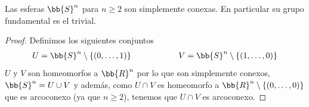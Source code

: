 \begin{coro}
    Las esferas $\bb{S}^n$ para $n\geq 2$ son simplemente conexas. En particular su grupo fundamental es el trivial.

    \begin{proof}
        Definimos los siguientes conjuntos
        \begin{gather*}
            U=\bb{S}^n \setminus \{(0,\dots,1)\} \hspace{2cm} 
            V = \bb{S}^n \setminus \{(1,\dots,0)\}
        \end{gather*}
        $U$ y $V$ son homeomorfos a $\bb{R}^n$ por lo que son simplemente conexos, $\bb{S}^n=U\cup V$ y además, como $U\cap V$ es homeomorfo a $\bb{R}^n \setminus \{(0,\dots,0)\}$ que es arcoconexo (ya que $n\geq 2$), tenemos que $U\cap V$ es arcoconexo.
    \end{proof}
\end{coro}

